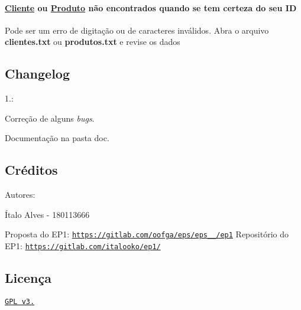 \paragraph*{\hyperlink{class_cliente}{Cliente} ou \hyperlink{class_produto}{Produto} não encontrados quando se tem certeza do seu ID}


\begin{DoxyItemize}
\item Pode ser um erro de digitação ou de caracteres inválidos. Abra o arquivo {\bfseries clientes.\+txt} ou {\bfseries produtos.\+txt} e revise os dados
\end{DoxyItemize}

\subsection*{Changelog}

1.\+:


\begin{DoxyItemize}
\item Correção de alguns {\itshape bugs}.
\item Documentação na pasta doc.
\end{DoxyItemize}

\subsection*{Créditos}

Autores\+:


\begin{DoxyItemize}
\item Ítalo Alves -\/ 180113666
\end{DoxyItemize}

Proposta do E\+P1\+: \href{https://gitlab.com/oofga/eps/eps_2019_2/ep1}{\tt https\+://gitlab.\+com/oofga/eps/eps\+\_\+\_/ep1} Repositório do E\+P1\+: \href{https://gitlab.com/italooko/ep1/}{\tt https\+://gitlab.\+com/italooko/ep1/}

\subsection*{Licença}

\href{https://www.gnu.org/licenses/gpl-3.0.en.html}{\tt G\+PL v3.} 